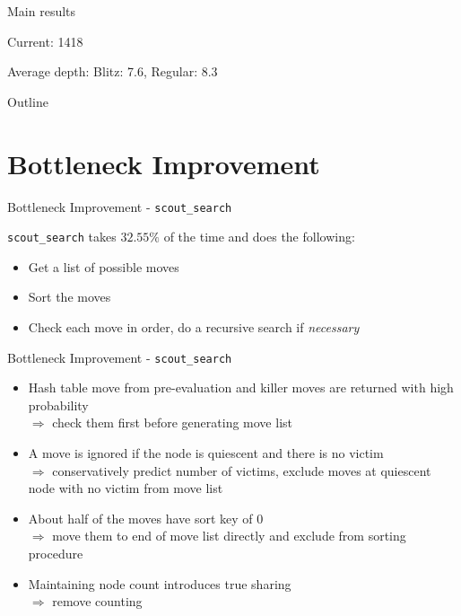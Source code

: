 \documentclass[10pt]{beamer}
\newcommand{\itema}{\item[*]}
\begin{document}
\begin{frame}{Main results}
\begin{table}
\begin{minipage}[b]{0.45\textwidth}
        Current: 1418
        \end{minipage}
        \end{table}
        \centering
        Average depth: Blitz: 7.6, Regular: 8.3


	\end{frame}

    \begin{frame}{Outline}
    \tableofcontents
    \end{frame}

    \section{Bottleneck Improvement}
    \begin{frame}{Bottleneck Improvement - \tt{scout\_search}}

        {\tt scout\_search} takes $32.55\%$ of the time and does the following:
        \begin{itemize}
            \itema Get a list of possible moves
            \itema Sort the moves
            \itema Check each move in order, do a recursive search if {\it necessary}
        \end{itemize}
    \end{frame}

	\begin{frame}{Bottleneck Improvement - \tt{scout\_search}}
	    \begin{itemize}
	        \itema Hash table move from pre-evaluation and killer moves are returned with high probability \\
	        $\Rightarrow$ check them first before generating move list
	        \itema A move is ignored if the node is quiescent and there is no victim\\
	        $\Rightarrow$ conservatively predict number of victims, exclude moves at quiescent node with no victim from move list
	        \itema About half of the moves have sort key of 0 \\
	        $\Rightarrow$ move them to end of move list directly and exclude from sorting procedure
	        \itema Maintaining node count introduces true sharing \\
	        $\Rightarrow$ remove counting
	    \end{itemize}


	\end{frame}
\end{document}
